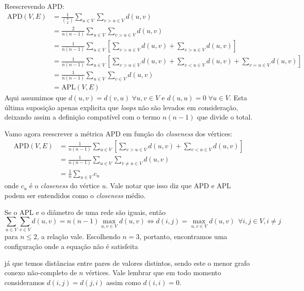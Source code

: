 \documentclass[l15, tikzdraw]{homework}
\begin{document}
	\subquest{}%
	Reescrevendo APD:
	\begin{align*}
		\text{APD}(V, E) %
		&= \frac{1}{\binom{n}{2}} \sum_{u \in V} \sum_{v > u \in V} d(u, v)\\[1ex]
		&= \frac{2}{n (n - 1)} \sum_{u \in V} \sum_{v > u \in V} d(u, v)\\[1ex]
		&= \frac{1}{n (n - 1)} \sum_{u \in V} \left[ \sum_{v > u \in V} d(u, v) + \sum_{v > u \in V} d(u, v) \right]\\
		&= \frac{1}{n (n - 1)} \sum_{u \in V} \left[ \sum_{v > u \in V} d(u, v) + \sum_{v < u \in V} d(u, v) + \sum_{v = u \in V} d(u, v)\right]\\
		&= \frac{1}{n (n - 1)} \sum_{u \in V} \sum_{v \in V} d(u, v)\\
		&= \text{APL}(V, E)
	\end{align*}
	Aqui assumimos que $d(u, v) = d(v, u) \;\forall u, v \in V$ e $d(u, u) = 0 \;\forall u \in V$. Esta última suposição apenas explicita que \textit{loops} não são levados em consideração, deixando assim a definição compatível com o termo $n (n - 1)$ que divide o total.\par

	Vamo agora reescrever a métrica APD em função do \textit{closeness} dos vértices:
	\begin{align*}
		\text{APD}(V, E) %
		&= \frac{1}{n (n - 1)} \sum_{u \in V} \left[ \sum_{v > u \in V} d(u, v) + \sum_{v < u \in V} d(u, v) \right]\\
		&= \frac{1}{n (n - 1)} \sum_{u \in V} \sum_{v \neq u \in V} d(u, v) \\
		&= \frac{1}{n} \sum_{u \in V} c_u
	\end{align*}
	onde $c_u$ é o \textit{closeness} do vértice $u$. Vale notar que isso diz que APD e APL podem ser entendidos como o \textit{closeness} médio.

	\subquest{}%
	Se o APL e o diâmetro de uma rede são iguais, então
		$$%
		\sum_{u \in V} \sum_{v \in V} d(u, v) = n (n - 1) \max_{u, v \in V} d(u, v) \iff d(i, j) = \max_{u, v \in V} d(u, v) ~~\forall i, j \in V, i \neq j
		$$%
	para $n \le 2$, a relação vale. Escolhendo $n = 3$, portanto, encontramos uma configuração onde a equação não é satisfeita

	\begin{fig}
		
	\end{fig}

	já que temos distâncias entre pares de valores distintos, sendo este o menor grafo conexo não-completo de $n$ vértices. Vale lembrar que em todo momento consideramos $d(i, j) = d(j, i)$ assim como $d(i, i) = 0$.
\end{document}
